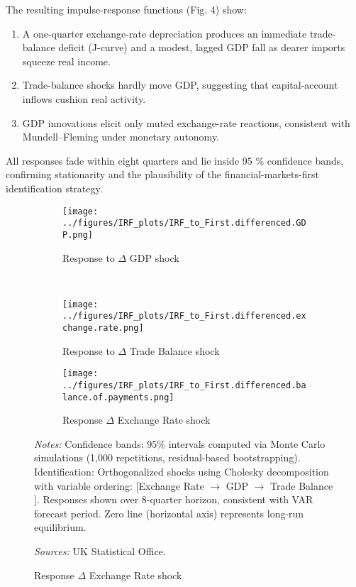 \documentclass[
]{article}
\begin{document}
	The resulting impulse-response functions (Fig. 4) show:
	
	\begin{enumerate}
		\item A one-quarter exchange-rate depreciation produces an immediate
		trade-balance deficit (J-curve) and a modest, lagged GDP fall as dearer
		imports squeeze real income.
		\item Trade-balance shocks hardly move GDP, suggesting that capital-account
		inflows cushion real activity.
		\item GDP innovations elicit only muted exchange-rate reactions, consistent
		with Mundell–Fleming under monetary autonomy.
	\end{enumerate}
	
	All responses fade within eight quarters and lie inside 95 \% confidence
	bands, confirming stationarity and the plausibility of the financial-markets-first
	identification strategy.
	
	
	
	\begin{figure}[!htbp]
		\centering
		\caption{\textsc{Impulse Response Functions}}
		\label{fig:irf1}
		
		\begin{subfigure}[b]{0.32\textwidth}
			\centering
			\texttt{[image: ../figures/IRF\_plots/IRF\_to\_First.differenced.GDP.png]}
			\caption{Response to $\Delta$ GDP shock}
			\label{fig:irf_gdp}
		\end{subfigure}
		\\
		\begin{subfigure}[b]{0.32\textwidth}
			\centering
			\texttt{[image: ../figures/IRF\_plots/IRF\_to\_First.differenced.exchange.rate.png]}
			\caption{Response to $\Delta$ Trade Balance shock}
			\label{fig:irf_tb}
		\end{subfigure}
		\begin{subfigure}[b]{0.32\textwidth}
			\centering
			\texttt{[image: ../figures/IRF\_plots/IRF\_to\_First.differenced.balance.of.payments.png]}
			\caption{Response $\Delta$ Exchange Rate shock}
			\label{fig:irf_fx}
		\end{subfigure}
		
		\begin{minipage}{\textwidth}
			\footnotesize
			\textit{Notes:} Confidence bands: 95\% intervals computed via Monte Carlo simulations (1,000 repetitions, residual-based bootstrapping).
			Identification: Orthogonalized shocks using Cholesky decomposition with variable ordering: 
			[Exchange Rate $\rightarrow$ GDP $\rightarrow$ Trade Balance ]. Responses shown over 8-quarter horizon, 
			consistent with VAR forecast period.
			Zero line (horizontal axis) represents long-run equilibrium.
			
			
			\textit{Sources:} UK Statistical Office.
		\end{minipage}
	\end{figure}
	
\end{document}
